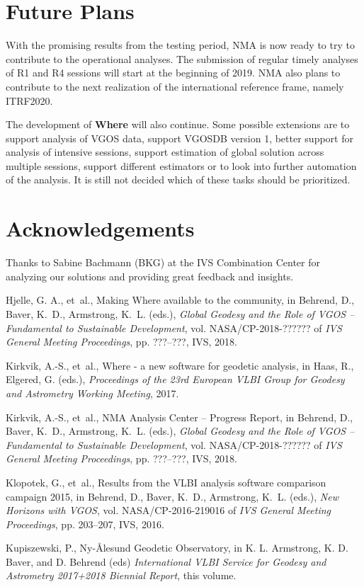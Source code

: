 \documentclass[twocolumn,twoside]{svmultivs_br} %
\begin{document}
\section{Future Plans}
With the promising results from the testing period, NMA is now ready to try to contribute to the operational analyses.
The submission of regular timely analyses of R1 and R4 sessions will start at the beginning of 2019. NMA also plans to
contribute to the next realization of the international reference frame, namely ITRF2020.

The development of \textbf{Where} will also continue. Some possible extensions are to support analysis of VGOS data,
support VGOSDB version 1, better support for analysis of intensive sessions, support estimation of global solution
across multiple sessions, support different estimators or to look into further automation of the analysis. It is still
not decided which of these tasks should be prioritized.

\section*{Acknowledgements}

Thanks to Sabine Bachmann (BKG) at the IVS Combination Center for analyzing our solutions and providing
great feedback and insights.

\begin{thebibliography}{99}
Hjelle, G. A., et~al., Making Where available to the community, in Behrend, D., Baver, K.~D., Armstrong, K.~L.
(eds.), \emph{Global Geodesy and the Role of VGOS – Fundamental to Sustainable Development}, vol. NASA/CP-2018-?????? of \emph{IVS General
Meeting Proceedings}, pp. ???--???, IVS, 2018.

Kirkvik, A.-S., et~al., Where - a new software for geodetic analysis, in Haas,
R., Elgered, G. (eds.), \emph{Proceedings of the 23rd European VLBI Group for
Geodesy and Astrometry Working Meeting}, 2017.

Kirkvik, A.-S., et~al., {NMA} Analysis Center -- Progress Report, in Behrend, D., Baver, K.~D., Armstrong, K.~L. (eds.),
\emph{Global Geodesy and the Role of VGOS – Fundamental to Sustainable Development}, vol. NASA/CP-2018-?????? of \emph{IVS General
Meeting Proceedings}, pp. ???--???, IVS, 2018.

Klopotek, G., et~al., Results from the {VLBI} analysis software comparison
campaign 2015, in Behrend, D., Baver, K.~D., Armstrong, K.~L. (eds.),
\emph{New Horizons with VGOS}, vol. NASA/CP-2016-219016 of \emph{IVS General
Meeting Proceedings}, pp. 203--207, IVS, 2016.

Kupiszewski, P., Ny-\AA lesund Geodetic Observatory, in K. L. Armstrong, K. D. Baver, and D. Behrend (eds)
\emph{International VLBI Service for Geodesy and Astrometry 2017+2018 Biennial Report}, this volume.

\end{thebibliography}
%
\end{document}
